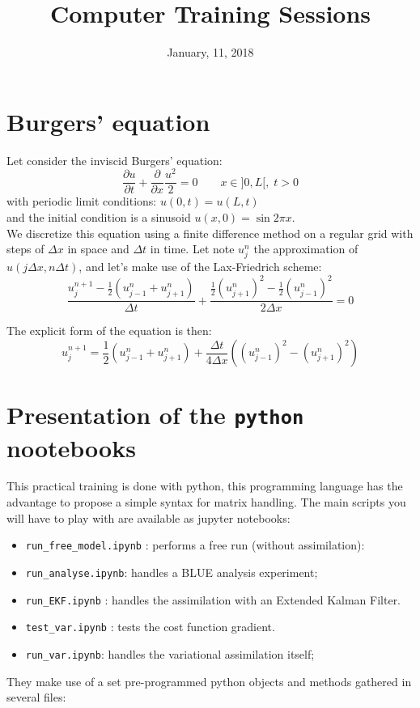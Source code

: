 \documentclass[11pt,a4paper]{article}
\title{Computer Training Sessions}
\date{January, 11, 2018}
\def\pl{\partial}
\def\unj{u^{n}_{j}}
\def\unpj{u^{n+1}_{j}}
\def\unjp{u^{n}_{j+1}}
\def\unjm{u^{n}_{j-1}}
\def\dx{\Delta x}
\def\dt{\Delta t}
\def\dudt{\frac{\partial u}{\partial t}}
\begin{document}
\maketitle
  \section{Burgers' equation}

Let consider the inviscid Burgers' equation:
 \[
 \dudt + \frac{\pl}{\pl x}\frac{u^2}{2} =0 \qquad x\in ]0,L[ , \; t>0
 \]
 with periodic limit conditions: $u(0,t)=u(L,t)$\\
and the initial condition is a sinusoid  $u(x,0)=\sin 2\pi x$.\vspace*{5mm}\\
%
We discretize this equation using a finite difference method on a regular grid with steps of $\Delta x$ in space and $\Delta t$ in time. Let note $\unj$ the approximation of $u(j\Delta x, n\Delta t)$, and let's make use of the Lax-Friedrich scheme:
 \[
 \frac{\unpj-\frac{1}{2}(\unjm+\unjp)}{\dt}+\frac{ \frac{1}{2} ({\unjp})^2 - \frac{1}{2} ({\unjm})^2}{2\dx}=0
 \]

The explicit form of the equation is then:
 \[
 \unpj=\frac{1}{2}(\unjm+\unjp)+\frac{\dt}{4\dx}(({\unjm})^2-({\unjp})^2)
 \]
%
%
 \section{Presentation of the \texttt{python} nootebooks}
%
 This practical training is done with python, this programming language has the advantage to propose a simple syntax for matrix handling. The main scripts you will have to play with are available as jupyter notebooks:
 
\begin{itemize}
	\item \texttt{run\_free\_model.ipynb} : performs a free run (without assimilation):
	\item \texttt{run\_analyse.ipynb}: handles a BLUE analysis experiment;
	\item \texttt{run\_EKF.ipynb} : handles the assimilation with an Extended Kalman Filter.
	\item \texttt{test\_var.ipynb} : tests the cost function gradient.
 	\item \texttt{run\_var.ipynb}: handles the variational assimilation itself;
 \end{itemize}
They make use of a set pre-programmed python objects and methods gathered in several files:
 
\end{document}
